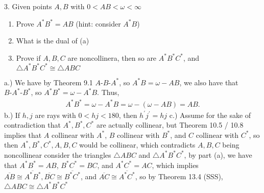 \documentclass{report}
\begin{document}
    \bigbreak \noindent 
    \begin{mdframed}
        3. Given points $A,B$ with $0 < AB < \omega < \infty$
        \begin{enumerate}[label=(\alph*)]
            \item Prove $A^{*}B^{*} = AB$ (hint: consider $A^{*}B$)
            \item What is the dual of (a)
            \item Prove if $A,B,C$ are noncollinera, then so are $A^{*}B^{*}C^{*}$, and $\triangle A^{*}B^{*}C^{*}  \cong \triangle ABC$
        \end{enumerate}
    \end{mdframed}
    \bigbreak \noindent 
    a.) We have by Theorem 9.1 $ A\text{-}B\text{-}A^{*}$, so $ A^{*}B = \omega - AB$, we also have that $ B\text{-}A^{*}\text{-}B^{*}$, so $ A^{*}B^{*} = \omega -A^{*}B$. Thus,
    \begin{align*}
        A^{*}B^{*} = \omega - A^{*}B = \omega - (\omega - AB) = AB
    .\end{align*}
    \bigbreak \noindent 
    b.) If $h,j$ are rays with $0 < hj < 180$, then $h^{\prime}j^{\prime} = hj $
    \bigbreak \noindent 
    c.) Assume for the sake of contradiction that $A^{*}, B^{*}, C^{*}$ are actually collinear, but Theorem 10.5 / 10.8 implies that $A$ collinear with $A^{*}$, $B$ collinear with $B^{*}$, and $C$ collinear with $C^{*}$, so then $A^{*}, B^{*}, C^{*}, A,B,C$ would be collinear, which contradicts $A,B,C$ being noncollinear
    \bigbreak \noindent 
    consider the triangles $\triangle ABC$ and $\triangle A^{*}B^{*}C^{*}$, by part (a), we have that $A^{*}B^{*} = AB$, $B^{*}C^{*} = BC$, and  $A^{*}C^{*} = AC$, which implies $ \overline{AB} \cong  \overline{A^{*}B^{*}}, \overline{BC} \cong \overline{B^{*}C^{*}}$, and $\overline{AC} \cong \overline{A^{*}C^{*}} $, so by Theorem 13.4 (SSS), $ \triangle ABC \cong \triangle A^{*}B^{*}C^{*}$
\end{document}
